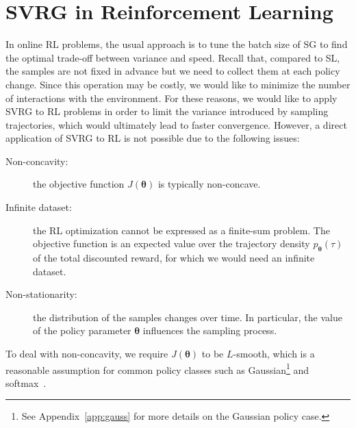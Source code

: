 \documentclass{article}
\makeatletter
\theoremstyle{remark}
\theoremstyle{definition}
\DeclareRobustCommand{\eg}{e.g.,\@\xspace}
\newcommand{\todopir}[1]{\todo[color=blued, inline]{\small #1}}
\newcommand{\vtheta}{\boldsymbol{\theta}}
\makeatother
\begin{document}
\section{SVRG in Reinforcement Learning}\label{sec:alg}
\vspace{-0.05in}
In online RL problems, the usual approach is to tune the batch size of SG to find the optimal trade-off between variance and speed.
Recall that, compared to SL, the samples are not fixed in advance but we need to collect them at each policy change.
Since this operation may be costly, we would like to minimize the number of interactions with the environment.
For these reasons, we would like to apply SVRG to RL problems in order to limit the variance introduced by sampling trajectories, which would ultimately lead to faster convergence.
However, a direct application of SVRG to RL is not possible due to the following issues:
\begin{description}
        \item[Non-concavity:] the objective function $J(\vtheta)$ is typically non-concave.
        \item[Infinite dataset:] the RL optimization cannot be expressed as a finite-sum problem. The objective function is an expected value over the trajectory density $p_{\vtheta}(\tau)$ of the total discounted reward, for which we would need an infinite dataset.
        \item[Non-stationarity:] the distribution of the samples changes over time. In particular, the value of the policy parameter $\vtheta$ influences the sampling process.
\end{description}
To deal with non-concavity, we require $J(\vtheta)$ to be $L$-smooth, which is a reasonable assumption for common policy classes such as Gaussian\footnote{See Appendix~\ref{app:gauss} for more details on the Gaussian policy case.} and softmax~\citep[\eg][]{Furmston2012unifying,pirotta2015lipschitz}.
\end{document}
